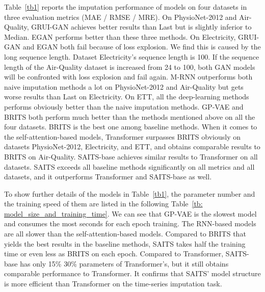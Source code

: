 \documentclass{article}
\begin{document}
Table~\ref{tb1} reports the imputation performance of models on four datasets in three evaluation metrics (MAE / RMSE / MRE). On PhysioNet-2012 and Air-Quality, GRUI-GAN achieves better results than Last but is slightly inferior to Median. EGAN performs better than these three methods. On Electricity, GRUI-GAN and EGAN both fail because of loss explosion. We find this is caused by the long sequence length. Dataset Electricity's sequence length is 100. If the sequence length of the Air-Quality dataset is increased from 24 to 100, both GAN models will be confronted with loss explosion and fail again. M-RNN outperforms both naive imputation methods a lot on PhysioNet-2012 and Air-Quality but gets worse results than Last on Electricity. On ETT, all the deep-learning methods performs obviously better than the naive imputation methods. GP-VAE and BRITS both perform much better than the methods mentioned above on all the four datasets. BRITS is the best one among baseline methods. When it comes to the self-attention-based models, Transformer surpasses BRITS obviously on datasets PhysioNet-2012, Electricity, and ETT, and obtains comparable results to BRITS on Air-Quality. SAITS-base achieves similar results to Transformer on all datasets. SAITS exceeds all baseline methods significantly on all metrics and all datasets, and it outperforms Transformer and SAITS-base as well.

To show further details of the models in Table~\ref{tb1}, the parameter number and the training speed of them are listed in the following Table~\ref{tb: model_size_and_training_time}. We can see that GP-VAE is the slowest model and consumes the most seconds for each epoch training. The RNN-based models are all slower than the self-attention-based models. Compared to BRITS that yields the best results in the baseline methods, SAITS takes half the training time or even less as BRITS on each epoch. Compared to Transformer, SAITS-base has only 15\%  30\% parameters of Transformer's, but it still obtains comparable performance to Transformer. It confirms that SAITS' model structure is more efficient than Transformer on the time-series imputation task.
\end{document}
